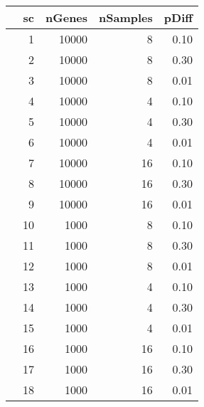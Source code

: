 \begin{table}[ht]
\centering
\begin{tabular}{rrrrr}
\hline
& sc & nGenes & nSamples & pDiff \\ 
\hline
& 1 & 10000 & 8 & 0.10 \\ 
& 2 & 10000 & 8 & 0.30 \\ 
& 3 & 10000 & 8 & 0.01 \\ 
& 4 & 10000 & 4 & 0.10 \\ 
& 5 & 10000 & 4 & 0.30 \\ 
& 6 & 10000 & 4 & 0.01 \\ 
& 7 & 10000 & 16 & 0.10 \\ 
& 8 & 10000 & 16 & 0.30 \\ 
& 9 & 10000 & 16 & 0.01 \\ 
& 10& 1000 & 8 & 0.10 \\ 
& 11 & 1000 & 8 & 0.30 \\ 
& 12 & 1000 & 8 & 0.01 \\ 
& 13 & 1000 & 4 & 0.10 \\ 
& 14 & 1000 & 4 & 0.30 \\ 
& 15 & 1000 & 4 & 0.01 \\ 
& 16 & 1000 & 16 & 0.10 \\ 
& 17 & 1000 & 16 & 0.30 \\ 
& 18 & 1000 & 16 & 0.01 \\ 
\hline
\end{tabular}
\end{table}